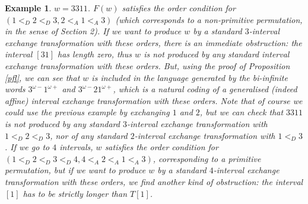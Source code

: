 \documentclass[12pt,a4paper]{amsart}
\newtheorem{example}{Example}
\begin{document}
\begin{example} $w=3311$. $F({w})$  satisfies the order condition for  $(1<_D 2<_D 3,2<_A 1<_A 3)$  (which corresponds to a non-primitive permutation, in the sense of Section 2). If we want to produce $w$ by a standard $3$-interval exchange transformation with these orders, there is an immediate obstruction: the interval $[31]$ has length zero, thus $w$ is not produced by any standard interval exchange transformation with these orders. But, using the proof of Proposition \ref{pfl}, we can see that $w$ is included in the language  generated by the bi-infinite words $3^{\omega-}1^{\omega+}$ and $3^{\omega-}21^{\omega+}$, which is a natural coding of a generalised (indeed affine) interval exchange transformation with these orders.  
Note that of course we could use the previous example by exchanging $1$ and $2$, but we can check that $3311$ is not produced by any standard $3$-interval exchange transformation with $1<_D 2<_D 3$, nor of any standard $2$-interval exchange transformation with $1<_D 3$. If we go to $4$ intervals, $w$ satisfies the order condition for  $(1<_D 2<_D 3 <_D 4,4<_A 2<_A 1<_A 3)$, corresponding to a primitive permutation, but  if we want to produce $w$ by a standard $4$-interval exchange transformation with these orders, we find another kind of  obstruction: the interval $[1]$ has to be strictly longer than $T[1]$. \end{example}
\end{document}
